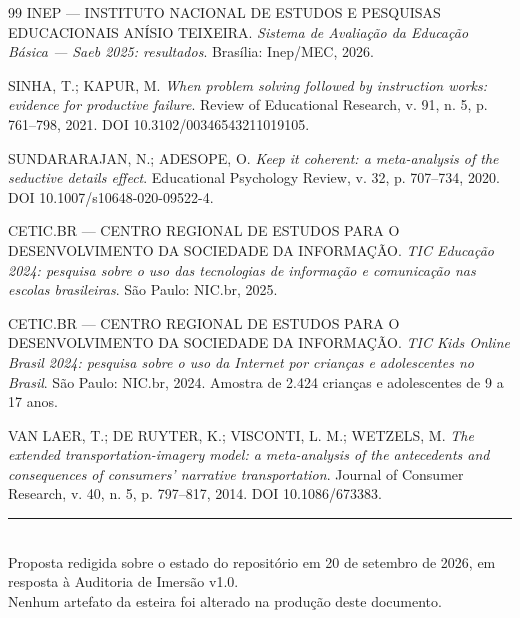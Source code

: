\documentclass[11pt,a4paper]{article}
\begin{document}
\begin{thebibliography}{99}
INEP --- INSTITUTO NACIONAL DE ESTUDOS E PESQUISAS EDUCACIONAIS ANÍSIO TEIXEIRA.
\emph{Sistema de Avaliação da Educação Básica --- Saeb 2025: resultados}.
Brasília: Inep/MEC, 2026.

SINHA, T.; KAPUR, M.
\emph{When problem solving followed by instruction works: evidence for productive failure}.
Review of Educational Research, v. 91, n. 5, p. 761--798, 2021.
DOI 10.3102/00346543211019105.

SUNDARARAJAN, N.; ADESOPE, O.
\emph{Keep it coherent: a meta-analysis of the seductive details effect}.
Educational Psychology Review, v. 32, p. 707--734, 2020.
DOI 10.1007/s10648-020-09522-4.

CETIC.BR --- CENTRO REGIONAL DE ESTUDOS PARA O DESENVOLVIMENTO DA SOCIEDADE DA INFORMAÇÃO.
\emph{TIC Educação 2024: pesquisa sobre o uso das tecnologias de informação e comunicação nas
escolas brasileiras}. São Paulo: NIC.br, 2025.

CETIC.BR --- CENTRO REGIONAL DE ESTUDOS PARA O DESENVOLVIMENTO DA SOCIEDADE DA INFORMAÇÃO.
\emph{TIC Kids Online Brasil 2024: pesquisa sobre o uso da Internet por crianças e adolescentes
no Brasil}. São Paulo: NIC.br, 2024. Amostra de 2.424 crianças e adolescentes de 9 a 17 anos.

VAN LAER, T.; DE RUYTER, K.; VISCONTI, L. M.; WETZELS, M.
\emph{The extended transportation-imagery model: a meta-analysis of the antecedents and
consequences of consumers' narrative transportation}.
Journal of Consumer Research, v. 40, n. 5, p. 797--817, 2014.
DOI 10.1086/673383.

\end{thebibliography}

\vspace{1cm}
\begin{center}
{\color{BorderGray}\rule{0.6\textwidth}{0.6pt}}\\[0.4cm]
{\small\color{Charcoal}
Proposta redigida sobre o estado do repositório em 20 de setembro de 2026, em resposta à
Auditoria de Imersão v1.0.\\
Nenhum artefato da esteira foi alterado na produção deste documento.}
\end{center}
\end{document}

